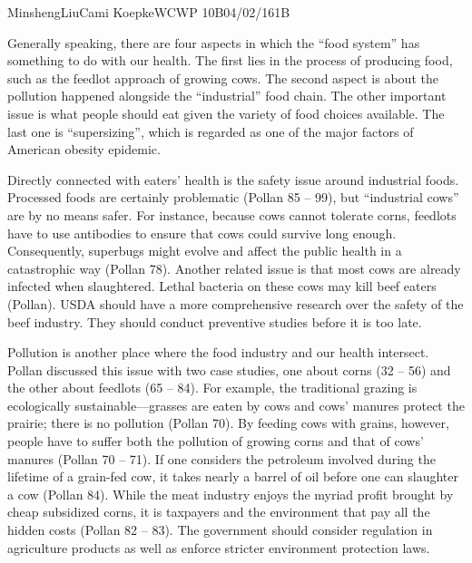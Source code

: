 \documentclass[12pt,letterpaper]{article}
\begin{document}
\begin{mla}{Minsheng}{Liu}{Cami Koepke}{WCWP 10B}{04/02/16}{1B}

Generally speaking, there are four aspects in which the ``food system''
has something to do with our health. The first lies in the process of
producing food, such as the feedlot approach of growing cows. The second
aspect is about the pollution happened alongside the ``industrial'' food
chain. The other important issue is what people should eat given the
variety of food choices available. The last one is ``supersizing'',
which is regarded as one of the major factors of American obesity
epidemic.

Directly connected with eaters' health is the safety issue around
industrial foods. Processed foods are certainly problematic (Pollan 85
-- 99), but ``industrial cows'' are by no means safer. For instance,
because cows cannot tolerate corns, feedlots have to use antibodies to
ensure that cows could survive long enough. Consequently, superbugs
might evolve and affect the public health in a catastrophic way (Pollan
78). Another related issue is that most cows are already infected when
slaughtered. Lethal bacteria on these cows may kill beef eaters
(Pollan). USDA should have a more comprehensive research over the safety
of the beef industry. They should conduct preventive studies before it
is too late.

Pollution is another place where the food industry and our health
intersect. Pollan discussed this issue with two case studies, one about
corns (32 -- 56) and the other about feedlots (65 -- 84). For example,
the traditional grazing is ecologically sustainable---grasses are eaten
by cows and cows' manures protect the prairie; there is no pollution
(Pollan 70). By feeding cows with grains, however, people have to suffer
both the pollution of growing corns and that of cows' manures (Pollan 70
-- 71). If one considers the petroleum involved during the lifetime of a
grain-fed cow, it takes nearly a barrel of oil before one can slaughter
a cow (Pollan 84). While the meat industry enjoys the myriad profit
brought by cheap subsidized corns, it is taxpayers and the environment
that pay all the hidden costs (Pollan 82 -- 83). The government should
consider regulation in agriculture products as well as enforce stricter
environment protection laws.


\end{mla}
\end{document}
